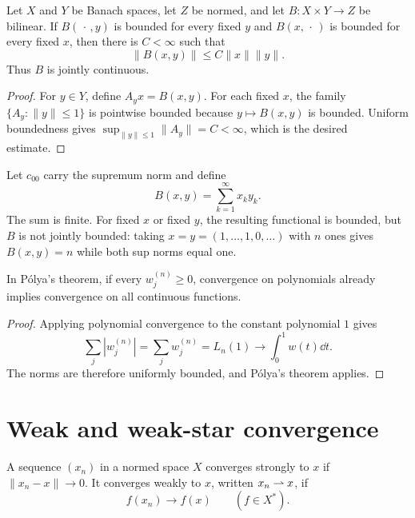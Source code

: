 \begin{notetheorem}
Let $X$ and $Y$ be Banach spaces, let $Z$ be normed, and let
$B\colon X\times Y\to Z$ be bilinear.  If $B(\,\cdot\,,y)$ is bounded for
every fixed $y$ and $B(x,\,\cdot\,)$ is bounded for every fixed $x$, then
there is $C<\infty$ such that
\[
  \|B(x,y)\|\le C\|x\|\|y\|.
\]
Thus $B$ is jointly continuous.
\end{notetheorem}

\begin{proof}
For $y\in Y$, define $A_yx=B(x,y)$.  For each fixed $x$, the family
$\{A_y:\|y\|\le1\}$ is pointwise bounded because
$y\mapsto B(x,y)$ is bounded.  Uniform boundedness gives
$\sup_{\|y\|\le1}\|A_y\|=C<\infty$, which is the desired estimate.
\end{proof}

\begin{noteexample}
Let $c_{00}$ carry the supremum norm and define
\[
  B(x,y)=\sum_{k=1}^{\infty}x_ky_k.
\]
The sum is finite.  For fixed $x$ or fixed $y$, the resulting functional is
bounded, but $B$ is not jointly bounded: taking $x=y=(1,\ldots,1,0,\ldots)$
with $n$ ones gives $B(x,y)=n$ while both sup norms equal one.
\end{noteexample}

\begin{notecorollary}
In P\'olya's theorem, if every $w_j^{(n)}\ge0$, convergence on polynomials
already implies convergence on all continuous functions.
\end{notecorollary}

\begin{proof}
Applying polynomial convergence to the constant polynomial $1$ gives
\[
  \sum_j|w_j^{(n)}|=\sum_jw_j^{(n)}=L_n(1)
  \longrightarrow\int_0^1w(t)\dd t.
\]
The norms are therefore uniformly bounded, and P\'olya's theorem applies.
\end{proof}

\section{Weak and weak-star convergence}

\begin{notedefinition}
A sequence $(x_n)$ in a normed space $X$ converges strongly to $x$ if
$\|x_n-x\|\to0$.  It converges weakly to $x$, written
$x_n\rightharpoonup x$, if
\[
  f(x_n)\longrightarrow f(x)
  \qquad(f\in X^*).
\]
\end{notedefinition}

